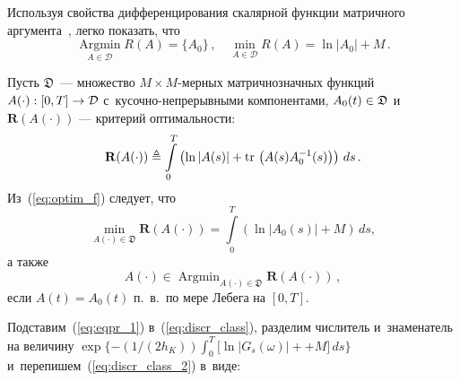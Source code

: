 \begin{multicols}{2}
{%

 \noindent
 Используя свойства дифференцирования скалярной функции матричного 
 аргумента~\cite{MN_02}, легко показать, что
 \begin{equation}
\mathop{\mathrm{Argmin}}\limits_{A \in \mathcal{D}} R(A) = 
\{A_0\}\,, \quad 
 \min\limits_{A \in \mathcal{D}} R(A) = \ln\left\vert A_0\right\vert  + M\,.
\label{eq:optim_f}
 \end{equation}

 Пусть $\mathfrak{D}$~--- множество ${M}\times M$-мер\-ных матричнозначных 
 функций $A(\cdot): [0,T] \hm\to \mathcal{D}$ с~ку\-соч\-но-не\-пре\-рыв\-ны\-ми 
 компонентами, $A_0(t)\hm \in \mathfrak{D}$ и~$ \mathbf{R}(A(\cdot))$ --- критерий оптимальности:
  \begin{equation*}
 \mathbf{R}(A(\cdot)) \triangleq \int\limits_0^T\left(
 \ln|A(s)| + \mathop{\mathrm{tr}}\,\left(A(s)A_0^{-1}(s)\right)\right)\,ds\,.
 \end{equation*}
 Из~(\ref{eq:optim_f}) следует, что
 \begin{equation}
 \min\limits_{A(\cdot) \in \mathfrak{D}} \mathbf{R}(A(\cdot)) = 
 \int\limits_0^T\left(\ln|A_0(s)| + M\right)\,ds,
 \label{eq:optim_f_3}
 \end{equation}
 а также
  \begin{equation*}
 A(\cdot) \in \mathop{\mathrm{Argmin}}_{A(\cdot) \in 
 \mathfrak{D}} \mathbf{R}(A(\cdot))\,,
 \end{equation*}
 если $A(t)=A_0(t)$ п.~в.\ по мере Лебега на $[0,T]$.

 Подставим~(\ref{eq:eqpr_1}) в~(\ref{eq:discr_class}), 
разделим числитель и~знаменатель на величину 
 $\exp\{-({1}/({2h_K})) 
 \int\nolimits_0^T[\ln|G_s(\omega)|+$\linebreak $+M]\,ds
 \}$ 
 и~перепишем~(\ref{eq:discr_class_2}) в~виде:
 
}
\end{multicols}
